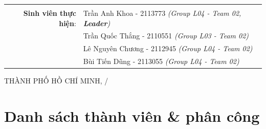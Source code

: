 \documentclass[a4paper, 11pt]{article}
\begin{document}
\begin{titlepage}
\begin{table}[h]
\begin{tabular}{rl}
                                          &                                                                       \\[10pt]
            \textbf{Sinh viên thực hiện}: & Trần Anh Khoa - 2113773 \emph{(Group L04 - Team 02, \textbf{Leader})} \\
                                          & Trần Quốc Thắng - 2110551 \emph{(Group L03 - Team 02)}                \\
                                          & Lê Nguyên Chương - 2112945 \emph{(Group L04 - Team 02)}               \\
                                          & Bùi Tiến Dũng - 2113055 \emph{(Group L04 - Team 02)}                  \\
        \end{tabular}
    \end{table}

    \begin{center}
        {\footnotesize THÀNH PHỐ HỒ CHÍ MINH, \the\month/\the\year}
    \end{center}
\end{titlepage}

\pagebreak
\tableofcontents
\pagebreak

\printunsrtglossary[type={symbols}, title={Danh sách ký hiệu}]
\printunsrtglossary[type={abbreviations}, title={Danh sách từ viết tắt}]
\pagebreak
\listoffigures
\listoftables
\pagebreak
{}


\section*{Danh sách thành viên \& phân công}
\end{document}
